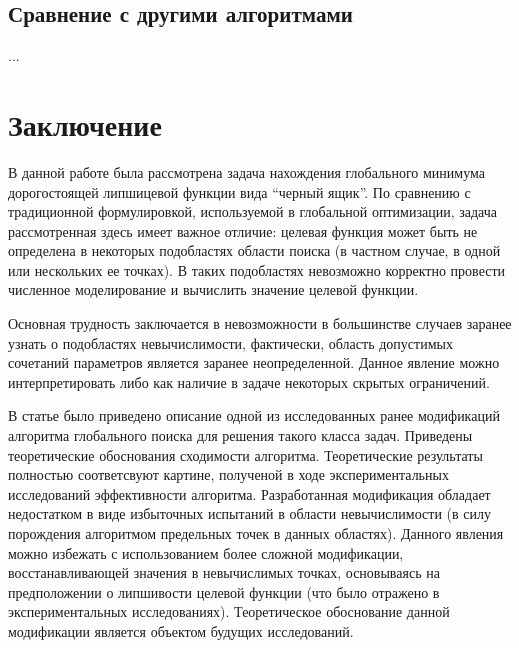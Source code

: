 \documentclass[10pt,a4paper]{book}
\begin{document}
\subsection{Сравнение с другими алгоритмами}

...

\section{Заключение}

В данной работе была рассмотрена задача нахождения глобального минимума дорогостоящей липшицевой функции вида ``черный ящик''. По сравнению с традиционной формулировкой, используемой в глобальной оптимизации, задача рассмотренная здесь имеет важное отличие: целевая функция может быть не определена в некоторых подобластях области поиска (в частном случае, в одной или нескольких ее точках). В таких подобластях невозможно корректно провести численное моделирование и вычислить значение целевой функции.

Основная трудность заключается в невозможности в большинстве случаев заранее узнать о подобластях невычислимости, фактически, область допустимых сочетаний параметров является заранее неопределенной. Данное явление можно интерпретировать либо как наличие в задаче некоторых скрытых ограничений.

В статье было приведено описание одной из исследованных ранее модификаций алгоритма глобального поиска для решения такого класса задач. Приведены теоретические обоснования сходимости алгоритма. Теоретические результаты полностью соответсвуют картине, полученой в ходе экспериментальных исследований эффективности алгоритма. Разработанная модификация обладает недостатком в виде избыточных испытаний в области невычислимости (в силу порождения алгоритмом предельных точек в данных областях). Данного явления можно избежать с использованием более сложной модификации, восстанавливающей значения в невычислимых точках, основываясь на предположении о липшивости целевой функции (что было отражено в экспериментальных исследованиях). Теоретическое обоснование данной модификации является объектом будущих исследований.

%
%
\LITERRUS
\end{document}
